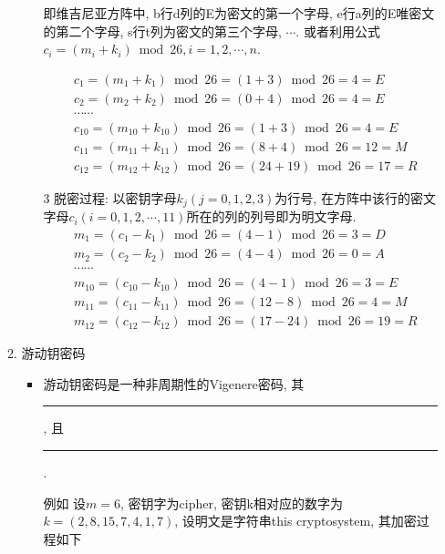 \documentclass[UTF8]{ctexart}
\newcommand\hl{\bgroup\markoverwith
  {\textcolor{yellow}{\rule[-.5ex]{2pt}{2.5ex}}}\ULon}
\begin{document}
\begin{itemize}
\begin{enumerate}
\begin{itemize}
                即维吉尼亚方阵中, b行d列的E为密文的第一个字母, e行a列的E唯密文的第二个字母, s行t列为密文的第三个字母, $\cdots$.
                或者利用公式$c_i=(m_i+k_i)\bmod 26, i=1, 2, \cdots, n$.

                $$
                \begin{aligned}
                    &c_1 = (m_1+k_1) \bmod 26 = (1+3) \bmod 26 = 4 = E\\
                    &c_2 = (m_2+k_2) \bmod 26 = (0+4) \bmod 26 = 4 = E\\
                    &\cdots \cdots\\
                    &c_{10} = (m_{10}+k_{10}) \bmod 26 = (1+3) \bmod 26 = 4 = E\\
                    &c_{11} = (m_{11}+k_{11}) \bmod 26 = (8+4) \bmod 26 = 12 = M\\
                    &c_{12} = (m_{12}+k_{12}) \bmod 26 = (24+19) \bmod 26 = 17 = R
                \end{aligned}
                $$

                \item [3] 脱密过程: 以密钥字母$k_j(j=0,1,2,3)$为行号, 在方阵中该行的密文字母$c_i(i=0,1,2, \cdots,11)$所在的列的列号即为明文字母.
                $$
                \begin{aligned}
                    &m_1 = (c_1-k_1) \bmod 26 = (4-1) \bmod 26 = 3 = D\\
                    &m_2 = (c_2-k_2) \bmod 26 = (4-4) \bmod 26 = 0 = A\\
                    &\cdots \cdots\\
                    &m_{10} = (c_{10}-k_{10}) \bmod 26 = (4-1) \bmod 26 = 3 = E\\
                    &m_{11} = (c_{11}-k_{11}) \bmod 26 = (12-8) \bmod 26 = 4 = M\\
                    &m_{12} = (c_{12}-k_{12}) \bmod 26 = (17-24) \bmod 26 = 19 = R
                \end{aligned}
                $$

            \end{itemize}

            \item 游动钥密码
            \begin{itemize}
                \item 游动钥密码是一种非周期性的Vigenere密码, 其\hl{密钥和明文信息一样长}, 且\hl{不重复}.

                例如 设$m=6$, 密钥字为cipher, 密钥k相对应的数字为$k=(2,8,15,7,4,1,7)$, 设明文是字符串this cryptosystem, 其加密过程如下


\end{itemize}
\end{enumerate}
\end{itemize}
\end{document}
